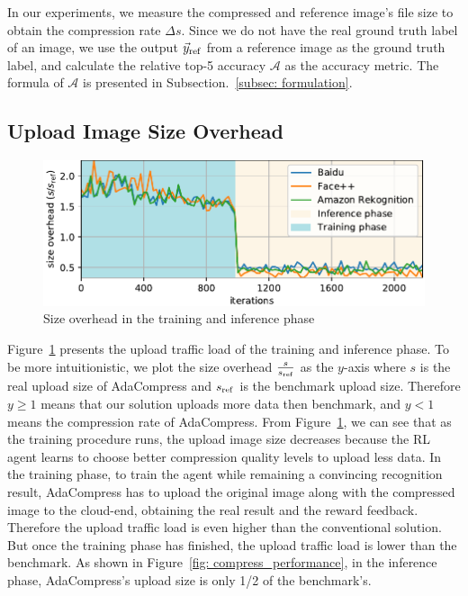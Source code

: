 In our experiments, we measure the compressed and reference image's file size to obtain the compression rate $ \Delta s $. Since we do not have the real ground truth label of an image, we use the output $ \vec{y}_{\rm ref} $ from a reference image as the ground truth label, and calculate the relative top-5 accuracy $ \mathcal{A} $ as the accuracy metric. The formula of $ \mathcal{A} $ is presented in Subsection.~\ref{subsec: formulation}.

\subsection{Upload Image Size Overhead}

\begin{figure}[!t]
	\includegraphics[width=0.8\linewidth]{figures/train_steps_new.pdf}
	\caption{Size overhead in the training and inference phase}
	\label{fig: train_steps}
\end{figure}

Figure~\ref{fig: train_steps} presents the upload traffic load of the training and inference phase. To be more intuitionistic, we plot the size overhead $ \frac{s}{s_{\rm ref}} $ as the $ y $-axis where $ s $ is the real upload size of AdaCompress and $ s_{\rm ref} $ is the benchmark upload size. Therefore $ y \geq 1 $ means that our solution uploads more data then benchmark, and $ y < 1 $ means the compression rate of AdaCompress. From Figure~\ref{fig: train_steps}, we can see that as the training procedure runs, the upload image size decreases because the RL agent learns to choose better compression quality levels to upload less data. In the training phase, to train the agent while remaining a convincing recognition result, AdaCompress has to upload the original image along with the compressed image to the cloud-end, obtaining the real result and the reward feedback. Therefore the upload traffic load is even higher than the conventional solution. But once the training phase has finished, the upload traffic load is lower than the benchmark. As shown in Figure~\ref{fig: compress_performance}, in the inference phase, AdaCompress's upload size is only 1/2 of the benchmark's. %

